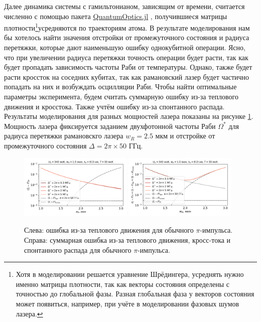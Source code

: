 Далее динамика системы с гамильтонианом, зависящим от времени, считается численно с помощью пакета \href{https://www.qojulia.org/}{QuantumOptics.jl} \cite{kramer2018quantumoptics}, получившиеся матрицы плотности\footnote{Хотя в моделировании решается уравнение Шрёдингера, усреднять нужно именно матрицы плотности, так как векторы состояния определены с точностью до глобальной фазы. Разная глобальная фаза у векторов состояния может появиться, например, при учёте в моделировании фазовых шумов лазера. }усредняются по траекториям атома. В результате моделирования нам бы хотелось найти значения отстройки от промежуточного состояния и радиуса перетяжки, которые дают наименьшую ошибку однокубитной операции. Ясно, что при увеличении радиуса перетяжки точность операции будет расти, так как будет пропадать зависимость частоты Раби от температуры. Однако, также будет расти кроссток на соседних кубитах, так как рамановский лазер будет частично попадать на них и возбуждать осцилляции Раби. Чтобы найти оптимальные параметры эксперимента, будем считать суммарную ошибку из-за теплового движения и кросстока. Также учтём ошибку из-за спонтанного распада. Результаты моделирования для разных мощностей лазера показаны на рисунке \ref{fig:simple_pulse_errors}. Мощность лазера фиксируется заданием двухфотонной частоты Раби $\Omega^*$ для радиуса перетяжки рамановскго лазера $w_R = 2.5\text{ мкм}$ и отстройке от промежуточного состояния $\Delta = 2\pi \times 50 \text{ ГГц}$.

\begin{figure}[H]
	\centering
	\includegraphics[width=0.48\textwidth]{images/simple_Omega.pdf}
	\includegraphics[width=0.48\textwidth]{images/simple_Omega_total.pdf}
	\caption{Слева: ошибка из-за теплового движения для обычного $\pi$-импульса. Справа: суммарная ошибка из-за теплового движения, кросс-тока и спонтанного распада для обычного $\pi$-импульса.}
	\label{fig:simple_pulse_errors}
\end{figure}

